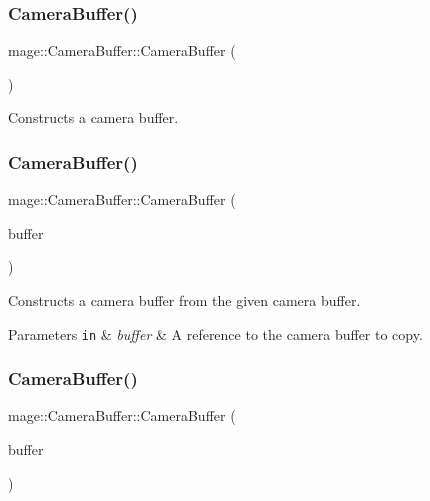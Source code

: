 \subsubsection{\texorpdfstring{Camera\+Buffer()}{CameraBuffer()}\hspace{0.1cm}{\footnotesize\ttfamily [1/3]}}
{\footnotesize\ttfamily mage\+::\+Camera\+Buffer\+::\+Camera\+Buffer (\begin{DoxyParamCaption}{ }\end{DoxyParamCaption})}

Constructs a camera buffer. \hypertarget{structmage_1_1_camera_buffer_a4677e0eeb321f52a6f0160c7265186a3}{}\label{structmage_1_1_camera_buffer_a4677e0eeb321f52a6f0160c7265186a3} 
\subsubsection{\texorpdfstring{Camera\+Buffer()}{CameraBuffer()}\hspace{0.1cm}{\footnotesize\ttfamily [2/3]}}
{\footnotesize\ttfamily mage\+::\+Camera\+Buffer\+::\+Camera\+Buffer (\begin{DoxyParamCaption}\item[{const \hyperlink{structmage_1_1_camera_buffer}{Camera\+Buffer} \&}]{buffer }\end{DoxyParamCaption})\hspace{0.3cm}{\ttfamily [default]}}

Constructs a camera buffer from the given camera buffer.


\begin{DoxyParams}[1]{Parameters}
\mbox{\tt in}  & {\em buffer} & A reference to the camera buffer to copy. \\
\hline
\end{DoxyParams}
\hypertarget{structmage_1_1_camera_buffer_a9ed685bdafbdc4b87546c082588f07c3}{}\label{structmage_1_1_camera_buffer_a9ed685bdafbdc4b87546c082588f07c3} 
\subsubsection{\texorpdfstring{Camera\+Buffer()}{CameraBuffer()}\hspace{0.1cm}{\footnotesize\ttfamily [3/3]}}
{\footnotesize\ttfamily mage\+::\+Camera\+Buffer\+::\+Camera\+Buffer (\begin{DoxyParamCaption}\item[{\hyperlink{structmage_1_1_camera_buffer}{Camera\+Buffer} \&\&}]{buffer }\end{DoxyParamCaption})\hspace{0.3cm}{\ttfamily [default]}}

